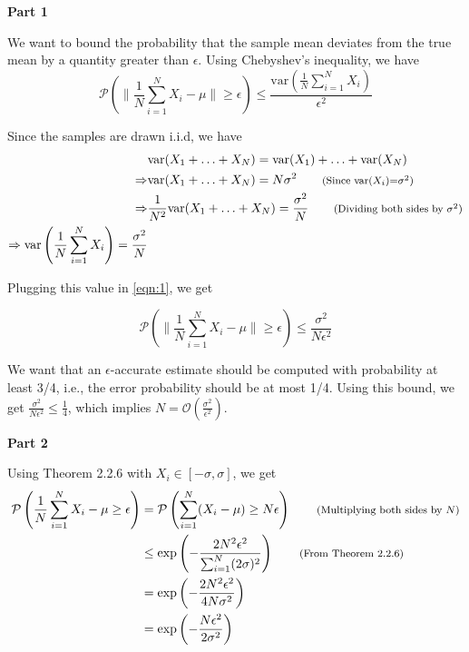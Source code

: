 \documentclass[11pt]{article}
\newenvironment{solution}[1][Solution]{\begin{trivlist}
\item[\hskip \labelsep {\bfseries #1}\hskip \labelsep]}{\end{trivlist}}
\newcommand*{\annot}[1]{\tag*{\footnotesize{(#1)}}}
\begin{document}
\begin{solution}
\textbf{Part 1}

We want to bound the probability that the sample mean deviates from the true mean by a quantity greater than $\epsilon$. Using Chebyshev's inequality, we have
\begin{equation}
\mathcal{P}\left( \lVert \frac{1}{N}\sum_{i=1}^N X_i - \mu \rVert \geq \epsilon \right) \leq \frac{\text{var}\left( \frac{1}{N}\sum_{i=1}^N X_i \right)}{\epsilon^2}
\label{eqn:1}
\end{equation}

Since the samples are drawn i.i.d, we have
\begin{align*}
& \text{var}(X_1 + \ldots + X_N) = \text{var}(X_1) + \ldots + \text{var}(X_N) \\
\Rightarrow & \text{var}(X_1 + \ldots + X_N) = N\sigma^2 \annot{Since var($X_i$)=$\sigma^2$} \\
\Rightarrow & \frac{1}{N^2}\text{var}(X_1 + \ldots + X_N) = \frac{\sigma^2}{N} \annot{Dividing both sides by $\sigma^2$} \\
\Rightarrow \text{var}\left( \frac{1}{N}\sum_{i=1}^N X_i \right) = \frac{\sigma^2}{N} \\
\end{align*}

Plugging this value in \ref{eqn:1}, we get

\begin{equation*}
\mathcal{P}\left( \lVert \frac{1}{N}\sum_{i=1}^N X_i - \mu \rVert \geq \epsilon \right) \leq \frac{\sigma^2}{N\epsilon^2}
\end{equation*}

We want that an $\epsilon$-accurate estimate should be computed with probability at least 3/4, i.e., the error probability should be at most 1/4. Using this bound, we get $\frac{\sigma^2}{N\epsilon^2} \leq \frac{1}{4}$, which implies $N = \mathcal{O}(\frac{\sigma^2}{\epsilon^2})$.

\textbf{Part 2}

Using Theorem 2.2.6 with $X_i \in [-\sigma,\sigma]$, we get
\begin{align*}
\mathcal{P}\left( \frac{1}{N}\sum_{i=1}^N X_i - \mu \geq \epsilon \right) &= \mathcal{P}\left( \sum_{i=1}^N (X_i - \mu) \geq N\epsilon \right) \annot{Multiplying both sides by $N$}\\
	&\leq \exp \left( -\frac{2N^2\epsilon^2}{\sum_{i=1}^N(2\sigma)^2} \right) \annot{From Theorem 2.2.6} \\
	&= \exp \left( -\frac{2N^2\epsilon^2}{4N\sigma^2} \right) \\
	&= \exp \left( -\frac{N\epsilon^2}{2\sigma^2} \right) \\
\end{align*}


\end{solution}
\end{document}
